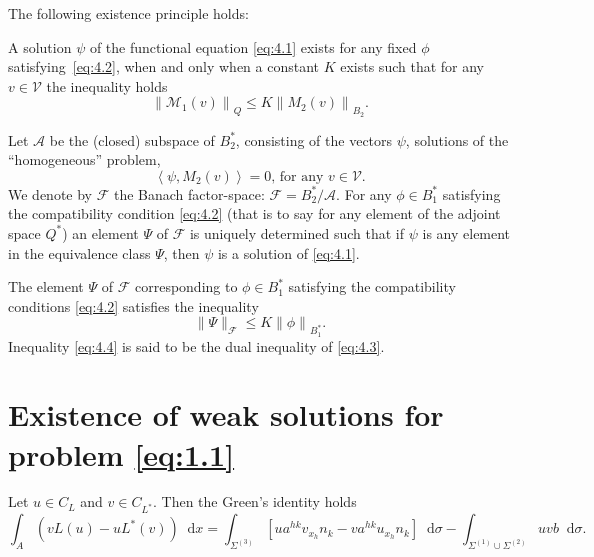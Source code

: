 \documentclass[a4paper,12pt,leqno]{article}
\numberwithin{equation}{section}
\newenvironment{thm}[1]
{\renewcommand\theinnerproblem{#1}\innerproblem}
{\endinnerproblem}
\newcommand{\dd}{\mathop{}\!\mathrm{d}}
\begin{document}
The following existence principle holds:

\begin{thm}{XIV} \label{XIV}
	A solution $\psi$ of the functional equation \eqref{eq:4.1} exists for any fixed $\phi$ satisfying~\eqref{eq:4.2}, when and only when a constant $K$ exists such that for any $v \in \mathscr{V}$ the inequality holds
	\begin{equation} \label{eq:4.3}
		\left\|\mathscr{M}_{1}(v)\right\|_{Q} \leq K\left\|M_{2}(v)\right\|_{B_{2}}.
	\end{equation}
\end{thm}

Let $\mathscr{A}$ be the (closed) subspace of $B_{2}^*$, consisting of the vectors $\psi$, solutions of the ``homogeneous'' problem,
\begin{equation*}
	\left\langle\psi, M_{2}(v)\right\rangle=0 \text{, for any } v \in \mathscr{V}.
\end{equation*}
We denote by $\mathscr{F}$ the Banach factor-space: $\mathscr{F}=B_{2}^* / \mathscr{A}$. For any $\phi \in B_{1}^*$ satisfying the compatibility condition \eqref{eq:4.2} (that is to say for any element of the adjoint space $Q^*$) an element $\Psi$ of $\mathscr{F}$ is uniquely determined such that if $\psi$ is any element in the equivalence class $\Psi$, then $\psi$ is a solution of \eqref{eq:4.1}.

\begin{thm}{XV} \label{XV}
	The element $\Psi$ of $\mathscr{F}$ corresponding to $\phi \in B_{1}^{*}$ satisfying the compatibility conditions \eqref{eq:4.2} satisfies the inequality
	\begin{equation} \label{eq:4.4}
		\|\Psi\|_{\mathscr{F}} \leq K\left\|{\phi}\right\|_{B_{1}^{*}}.
	\end{equation}
\end{thm}
Inequality \eqref{eq:4.4} is said to be the dual inequality of \eqref{eq:4.3}.

\section{Existence of weak solutions for problem \texorpdfstring{\eqref{eq:1.1}}{(1.1)}}

Let $u \in C_{L}$ and $v \in C_{L^*}$. Then the Green's identity holds
\begin{equation}
	\label{eq:5.1}
	\int_{A}(v L(u)-u L^*(v)) \dd x
	=\int_{\Sigma^{(3)}} \left[u a^{h k} v_{x_{h}} n_{k}-v a^{h k} u_{x_{h}}n_k \right] \dd \sigma
	- \int_{\Sigma^{(1)}\cup\Sigma^{(2)}} u v b \dd \sigma.
\end{equation}
\end{document}
